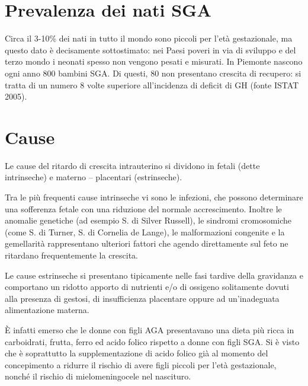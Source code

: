 \section{Prevalenza dei nati SGA}

Circa il 3-10\% dei nati in tutto il mondo sono piccoli per l'età gestazionale, 
ma questo dato è decisamente sottostimato: nei Paesi poveri in via di sviluppo 
e del terzo mondo i neonati spesso non vengono pesati e misurati\cite{sga-1}.
In Piemonte nascono ogni anno 800 bambini SGA. Di questi, 80 non presentano crescita di recupero: si tratta di un numero 8 volte superiore all'incidenza di deficit di GH (fonte ISTAT 2005).  


\section{Cause}


Le cause del ritardo di crescita intrauterino si dividono in
fetali (dette intrinseche) e materno -- placentari (estrinseche).


Tra le più frequenti cause intrinseche vi sono le infezioni, che possono determinare una sofferenza
fetale con una riduzione del normale accrescimento. 
Inoltre le anomalie genetiche (ad esempio S. di Silver Russell), le sindromi cromosomiche (come S. di Turner, S. di Cornelia de Lange), le malformazioni congenite e la gemellarità rappresentano
ulteriori fattori che agendo direttamente sul feto ne ritardano frequentemente la crescita.


Le cause estrinseche si presentano tipicamente nelle fasi tardive della gravidanza
e comportano un ridotto apporto di nutrienti e/o di ossigeno solitamente dovuti alla presenza di 
gestosi, di insufficienza placentare oppure ad un'inadeguata alimentazione materna.


\`E infatti emerso che le donne con figli AGA presentavano una dieta più ricca in carboidrati,
frutta, ferro ed acido folico rispetto a donne con figli SGA. Si è visto che è soprattutto la
supplementazione di acido folico già al momento del concepimento a ridurre il rischio di 
avere figli piccoli per l'età gestazionale, nonché il rischio di mielomeningocele nel nascituro.\cite{sga-26}



